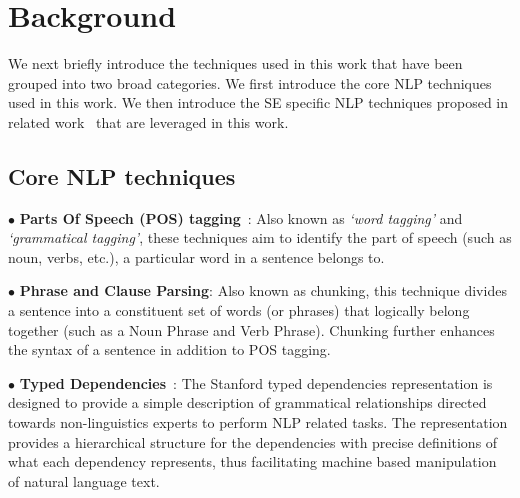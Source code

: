 \section{Background}
\label{sec:background}

We next briefly introduce the techniques used in this work that have been grouped into two broad categories.
We first introduce the core NLP techniques used in this work.
We then introduce the SE specific NLP techniques proposed in related work~\cite{pandita12:inferring,pandita13:WHYPER} that are leveraged in this work.

\subsection{Core NLP techniques}
\label{sub:CoreNLPback}



{\small $\bullet$} \textbf{Parts Of Speech (POS) tagging}~\cite{Klein03,KleinNIPS03}: Also known as \textit{`word tagging'} and \textit{`grammatical tagging'}, these techniques aim to identify the part of speech (such as noun, verbs, etc.), a particular word in a sentence belongs to.

{\small $\bullet$} \textbf{Phrase and Clause Parsing}: Also known as chunking, this technique divides a sentence into a constituent set of words (or phrases) that logically belong together (such as a Noun Phrase and Verb Phrase). Chunking further enhances the syntax of a sentence in addition to POS tagging.

{\small $\bullet$} \textbf{Typed Dependencies}~\cite{Marneffe06LREC,Marneffe08COLING}: The Stanford typed dependencies representation  is designed to provide a simple description of grammatical relationships directed towards non-linguistics experts to perform NLP related tasks. The representation provides a hierarchical structure for the dependencies with precise definitions of what each dependency represents, thus facilitating machine based manipulation of natural language text.


